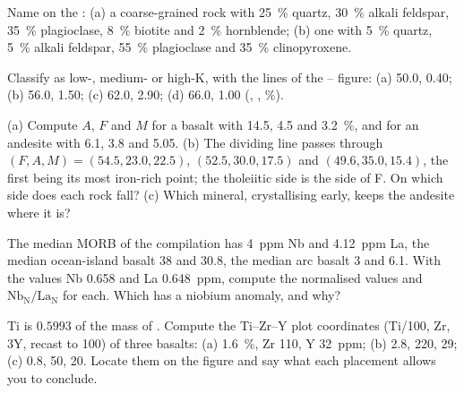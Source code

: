 \begin{exercise}[$\star$]\label{exo:b2:magmatic-series:3}
Name on the : (a) a coarse-grained rock with \qty{25}{\percent} quartz,
\qty{30}{\percent} alkali feldspar, \qty{35}{\percent} plagioclase, \qty{8}{\percent}
biotite and \qty{2}{\percent} hornblende; (b) one with \qty{5}{\percent} quartz,
\qty{5}{\percent} alkali feldspar, \qty{55}{\percent} plagioclase and
\qty{35}{\percent} clinopyroxene.
\end{exercise}

\begin{exercise}[$\star$]\label{exo:b2:magmatic-series:4}
Classify as low-, medium- or high-K, with the lines of the -- figure:
(a) 50.0, 0.40; (b) 56.0, 1.50; (c) 62.0, 2.90; (d) 66.0, 1.00 (,
, \unit{\percent}).
\end{exercise}

\begin{exercise}[$\star\star$]\label{exo:b2:magmatic-series:5}
(a) Compute $A$, $F$ and $M$ for a basalt with  14.5,  4.5 and
 \qty{3.2}{\percent}, and for an andesite with 6.1, 3.8 and 5.05.
(b) The dividing line passes through $(F, A, M) = (54.5, 23.0, 22.5)$, $(52.5, 30.0,
17.5)$ and $(49.6, 35.0, 15.4)$, the first being its most iron-rich point; the
tholeiitic side is the side of F. On which side does each rock fall? (c) Which
mineral, crystallising early, keeps the andesite where it is?
\end{exercise}

\begin{exercise}[$\star\star$]\label{exo:b2:magmatic-series:6}
The median MORB of the compilation has \qty{4}{ppm} Nb and \qty{4.12}{ppm} La, the
median ocean-island basalt 38 and 30.8, the median arc basalt 3 and 6.1. With the
 values Nb 0.658 and La \qty{0.648}{ppm}, compute the normalised values
and $\mathrm{Nb_N}/\mathrm{La_N}$ for each. Which has a niobium anomaly, and why?
\end{exercise}

\begin{exercise}[$\star\star$]\label{exo:b2:magmatic-series:7}
Ti is $0.5993$ of the mass of . Compute the Ti--Zr--Y plot coordinates
(Ti/100, Zr, $3\mathrm Y$, recast to 100) of three basalts: (a) 
\qty{1.6}{\percent}, Zr 110, Y \qty{32}{ppm}; (b) 2.8, 220, 29; (c) 0.8, 50, 20. Locate
them on the figure and say what each placement allows you to conclude.
\end{exercise}

